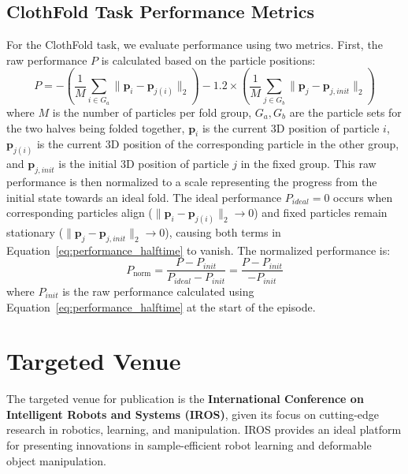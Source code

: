 \documentclass{article}
\begin{document}
\subsection*{ClothFold Task Performance Metrics}
For the ClothFold task, we evaluate performance using two metrics. First, the raw performance \(P\) is calculated based on the particle positions:
\begin{equation} \label{eq:performance_halftime}
P = - \left( \frac{1}{M} \sum_{i \in G_a} \| \mathbf{p}_i - \mathbf{p}_{j(i)} \|_2 \right) - 1.2 \times \left( \frac{1}{M} \sum_{j \in G_b} \| \mathbf{p}_j - \mathbf{p}_{j, init} \|_2 \right)
\end{equation}
where \(M\) is the number of particles per fold group, \(G_a, G_b\) are the particle sets for the two halves being folded together, \(\mathbf{p}_i\) is the current 3D position of particle \(i\), \(\mathbf{p}_{j(i)}\) is the current 3D position of the corresponding particle in the other group, and \(\mathbf{p}_{j, init}\) is the initial 3D position of particle \(j\) in the fixed group.
This raw performance is then normalized to a scale representing the progress from the initial state towards an ideal fold. The ideal performance \(P_{ideal} = 0\) occurs when corresponding particles align (\(\| \mathbf{p}_i - \mathbf{p}_{j(i)} \|_2 \to 0\)) and fixed particles remain stationary (\(\| \mathbf{p}_j - \mathbf{p}_{j, init} \|_2 \to 0\)), causing both terms in Equation~\eqref{eq:performance_halftime} to vanish. The normalized performance is:
\begin{equation} \label{eq:norm_performance_halftime}
P_{\text{norm}} = \frac{P - P_{init}}{P_{ideal} - P_{init}} = \frac{P - P_{init}}{- P_{init}}
\end{equation}
where \(P_{init}\) is the raw performance calculated using Equation~\eqref{eq:performance_halftime} at the start of the episode.


\section*{Targeted Venue}
The targeted venue for publication is the \textbf{International Conference on Intelligent Robots and Systems (IROS)}, given its focus on cutting-edge research in robotics, learning, and manipulation. IROS provides an ideal platform for presenting innovations in sample-efficient robot learning and deformable object manipulation.



\end{document}
